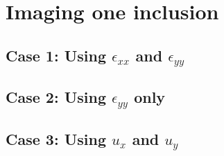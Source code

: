 \documentclass[12pt]{article}
\begin{document}
\section{Imaging one inclusion}
\subsection{Case 1: Using $\epsilon_{xx}$ and $\epsilon_{yy}$}
\subsection{Case 2: Using $\epsilon_{yy}$ only}
\subsection{Case 3: Using $u_x$ and $u_y$}
\end{document}
